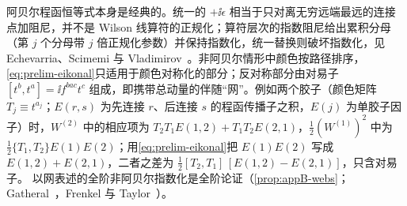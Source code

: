 阿贝尔程函恒等式本身是经典的。统一的 $+\ii\epsilon$ 相当于只对离无穷远端最远的连接点加阻尼，并不是 Wilson 线算符的正规化；算符层次的指数阻尼给出累积分母（第 $j$ 个分母带 $j$ 倍正规化参数）并保持指数化，统一替换则破坏指数化，见 Echevarria、Scimemi 与 Vladimirov~\cite[式~(5)--(6) 及其后的讨论]{Echevarria:2015byo}。非阿贝尔情形中颜色按路径排序，\cref{eq:prelim-eikonal}只适用于颜色对称化的部分；反对称部分由对易子 $[t^b,t^a]=\ii f^{bac}t^c$ 组成，即携带总动量的伴随“网”。例如两个胶子（颜色矩阵 $T_j\equiv t^{a_j}$；$E(r,s)$ 为先连接 $r$、后连接 $s$ 的程函传播子之积，$E(j)$ 为单胶子因子）时，$W^{(2)}$ 中的相应项为 $T_2T_1E(1,2)+T_1T_2E(2,1)$，$\frac12(W^{(1)})^2$ 中为 $\frac12\{T_1,T_2\}E(1)E(2)$；用\cref{eq:prelim-eikonal}把 $E(1)E(2)$ 写成 $E(1,2)+E(2,1)$，二者之差为 $\frac12[T_2,T_1]\,[E(1,2)-E(2,1)]$，只含对易子。%
以网表述的全阶非阿贝尔指数化是全阶论证（\cref{prop:appB-webs}；Gatheral~\cite{Gatheral1983}，Frenkel 与 Taylor~\cite{FrenkelTaylor1984}）。

